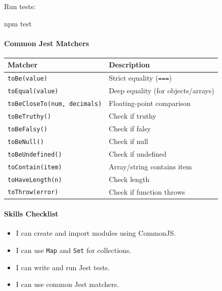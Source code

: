 \documentclass[
  justified,
  openright,
]{tufte-book}
\let\subsection\paragraph
\let\paragraph\paragraph
\newenvironment{Shaded}{%
  \begin{mdframed}[style=TufteCode]%
}{%
  \end{mdframed}%
}
\let\subsection\paragraph
\let\paragraph\paragraph
\providecommand{\tightlist}{%
  \setlength{\itemsep}{0pt}\setlength{\parskip}{0pt}}
\begin{document}
Run tests:

\begin{Shaded}
\begin{Highlighting}[]
npm test
\end{Highlighting}
\end{Shaded}

\subsection{Common Jest Matchers}\label{common-jest-matchers}

\begin{fullwidth}{\def\LTcaptype{none} %
\begin{longtable}[]{@{}ll@{}}
\toprule\noalign{}
Matcher & Description \\
\midrule\noalign{}
\endhead
\bottomrule\noalign{}
\endlastfoot
\texttt{toBe(value)} & Strict equality (\texttt{===}) \\
\texttt{toEqual(value)} & Deep equality (for objects/arrays) \\
\texttt{toBeCloseTo(num,\ decimals)} & Floating-point comparison \\
\texttt{toBeTruthy()} & Check if truthy \\
\texttt{toBeFalsy()} & Check if falsy \\
\texttt{toBeNull()} & Check if null \\
\texttt{toBeUndefined()} & Check if undefined \\
\texttt{toContain(item)} & Array/string contains item \\
\texttt{toHaveLength(n)} & Check length \\
\texttt{toThrow(error)} & Check if function throws \\
\end{longtable}
}
\end{fullwidth}

\subsection{Skills Checklist}\label{skills-checklist-66}

\begin{itemize}
\tightlist
\item[$\square$]
  I can create and import modules using CommonJS.
\item[$\square$]
  I can use \texttt{Map} and \texttt{Set} for collections.
\item[$\square$]
  I can write and run Jest tests.
\item[$\square$]
  I can use common Jest matchers.
\end{itemize}
\end{document}
